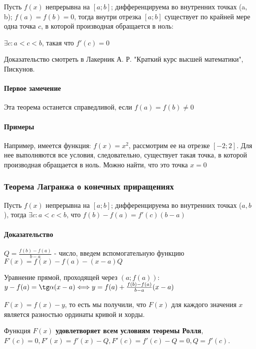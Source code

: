 \documentclass{article}
\begin{document}
\begin{flushleft}

Пусть $f(x)$ непрерывна на $[ a; b ]$; дифференцируема во внутренних точках (a, b); $f(a) = f(b) = 0$, тогда внутри отрезка $[ a; b ]$ существует по крайней мере одна точка $c$, в которой производная обращается в ноль:

$\exists c: a < c < b$, такая что $f'(c) = 0$

Доказательство смотреть в Лакерник А. Р. "Краткий курс высшей математики", Пискунов.

\paragraph{Первое замечение} Эта теорема останется справедливой, если $f(a) = f(b) \ne 0$

\paragraph{Примеры}

Например, имеется функция: $f(x) = x^2$, рассмотрим ее на отрезке $[-2; 2]$. Для нее выполняются все условия, следовательно, существует такая точка, в которой производная обращается в ноль. Можно найти, что это точка $x = 0$

\subsubsection{Теорема Лагранжа о конечных приращениях}

Пусть $f(x)$ непрерывна на $[ a; b ]$; дифференцируема во внутренних точках ($a, b$), тогда $\exists c: a < c < b$, что $f(b) - f(a) = f'(c)(b-a)$

\paragraph{Доказательство}

$Q = \frac{f(b) - f(a)}{b - a}$ - число, введем вспомогательную функцию $F(x) = f(x) - f(a) - (x - a)Q$

Уравнение прямой, проходящей через $(a; f(a))$: $y - f(a) = \tg \alpha (x - a) \Longleftrightarrow y = f(a) + \frac{f(b) - f(a)}{b - a}(x - a)$

$F(x) = f(x) - y$, то есть мы получили, что $F(x)$ для каждого значения $x$ является разностью ординаты кривой и хорды.

\hfill

Функция $F(x)$ \textbf{удовлетворяет всем условиям теоремы Ролля}, $F'(c) = 0, F'(x) = f'(x) - Q, F'(c) = f'(c) - Q = 0, Q = f'(c)$.


\end{flushleft}
\end{document}
